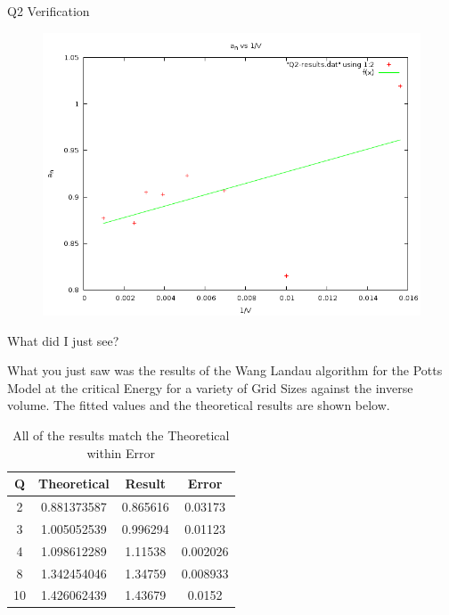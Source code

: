 \documentclass[12pt]{beamer}
\begin{document}
\begin{frame}{Q2 Verification}
\begin{figure}
\centering
\includegraphics[width=\textwidth]{Q2-Verification.png}
\end{figure}
\end{frame}

\begin{frame}{What did I just see?}

What you just saw was the results of the Wang Landau algorithm for the Potts Model at the critical Energy for a variety of Grid Sizes against the inverse volume.
The fitted values and the theoretical results are shown below.
\begin{table}[H]
\centering
\begin{tabular}{|c|c|c|c|}
\hline
Q  & Theoretical & Result   & Error    \\ \hline
2  & 0.881373587 & 0.865616 & 0.03173  \\ \hline
3  & 1.005052539 & 0.996294 & 0.01123  \\ \hline
4  & 1.098612289 & 1.11538  & 0.002026 \\ \hline
8  & 1.342454046 & 1.34759  & 0.008933 \\ \hline
10 & 1.426062439 & 1.43679  & 0.0152   \\ \hline
\end{tabular}
\caption{All of the results match the Theoretical within Error}
\end{table}

\end{frame}
\end{document}
